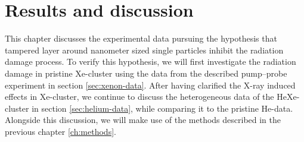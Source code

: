 \chapter{Results and discussion}\label{ch:results}
This chapter discusses the experimental data pursuing the hypothesis that tampered layer around nanometer sized single particles inhibit the radiation damage process. To verify this hypothesis, we will first investigate the radiation damage in pristine Xe-cluster using the data from the described pump--probe experiment in section \ref{sec:xenon-data}. After having clarified the X-ray induced effects in Xe-cluster, we continue to discuss the heterogeneous data of the HeXe-cluster in section \ref{sec:helium-data}, while comparing it to the pristine He-data. Alongside this discussion, we will make use of the methods described in the previous chapter \ref{ch:methods}.
%
%
%
